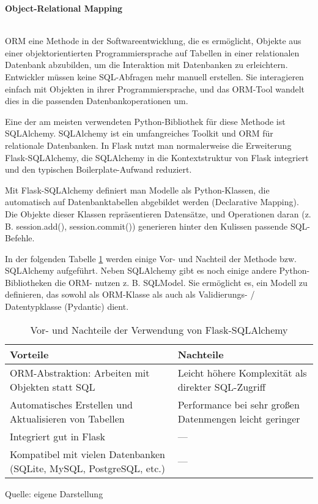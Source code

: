 \textbf{Object-Relational Mapping}

\\

\ac{ORM} eine Methode in der Softwareentwicklung, die es ermöglicht, Objekte aus einer objektorientierten Programmiersprache auf
Tabellen in einer relationalen Datenbank abzubilden, um die Interaktion mit Datenbanken zu erleichtern.
Entwickler müssen keine SQL-Abfragen mehr manuell erstellen.
Sie interagieren einfach mit Objekten in ihrer Programmiersprache,
und das ORM-Tool wandelt dies in die passenden Datenbankoperationen um. \cite{miguelgrinberg_flask_mega_tutorial_db,flask_official_sqlalchemy_pattern}

Eine der am meisten verwendeten Python-Bibliothek für diese Methode ist SQLAlchemy.
SQLAlchemy ist ein umfangreiches Toolkit und \ac{ORM} für relationale Datenbanken.
In Flask nutzt man normalerweise die Erweiterung Flask-SQLAlchemy, die SQLAlchemy in die Kontextstruktur von Flask
integriert und den typischen Boilerplate-Aufwand reduziert.\cite*{flask_sqlalchemy_docs}

Mit Flask-SQLAlchemy definiert man Modelle als Python-Klassen, die automatisch auf Datenbanktabellen abgebildet werden (Declarative Mapping).
Die Objekte dieser Klassen repräsentieren Datensätze, und Operationen daran (z. B. session.add(), session.commit()) generieren hinter den Kulissen passende SQL-Befehle.\cite*{flask_sqlalchemy_docs}

In der folgenden Tabelle \ref{tab:sqlalchemy_vor_nachteile} werden einige Vor- und Nachteil der Methode bzw. SQLAlchemy aufgeführt.
Neben SQLAlchemy gibt es noch einige andere Python-Bibliotheken die \ac{ORM}- nutzen z. B. SQLModel.
Sie ermöglicht es, ein Modell zu definieren, das sowohl als ORM-Klasse als auch als Validierungs- / Datentypklasse (Pydantic) dient\cite*{sqlmodel_docs}.

\begin{table}[H]
    \centering
    \begin{tabular}{|p{}|p{}|}
        \hline
        \textbf{Vorteile} & \textbf{Nachteile} \\
        \hline
        ORM-Abstraktion: Arbeiten mit Objekten statt SQL &
        Leicht höhere Komplexität als direkter SQL-Zugriff \\
        \hline
        Automatisches Erstellen und Aktualisieren von Tabellen &
        Performance bei sehr großen Datenmengen leicht geringer \\
        \hline
        Integriert gut in Flask &
        — \\
        \hline
        Kompatibel mit vielen Datenbanken (SQLite, MySQL, PostgreSQL, etc.) &
        — \\
        \hline
    \end{tabular}
    \caption{Vor- und Nachteile der Verwendung von Flask-SQLAlchemy}
    \label{tab:sqlalchemy_vor_nachteile}
    \vspace{0.2cm}
    {\small Quelle: eigene Darstellung}
\end{table}

